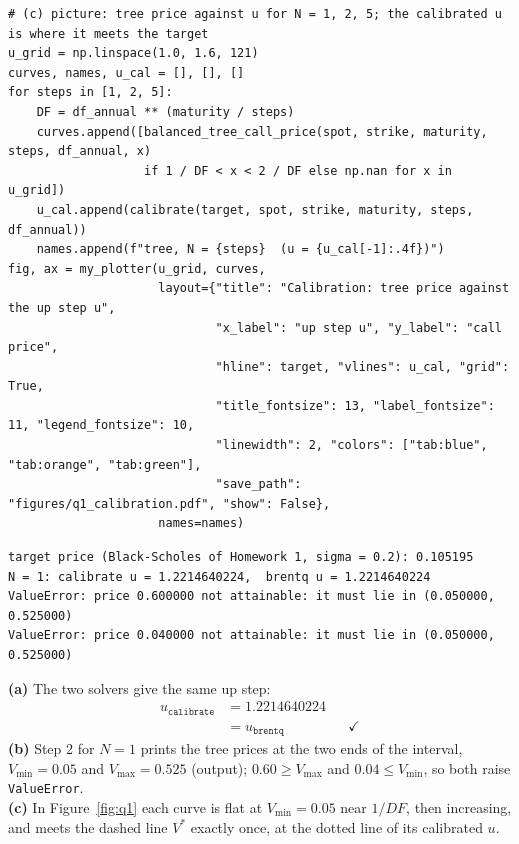 \documentclass[11pt,a4paper]{article}
\begin{document}
\begin{minipage}{\linewidth}
\begin{lstlisting}[style=pysmall,title={test (\texttt{q1\_calibrate\_test.py})}]
# (c) picture: tree price against u for N = 1, 2, 5; the calibrated u is where it meets the target
u_grid = np.linspace(1.0, 1.6, 121)
curves, names, u_cal = [], [], []
for steps in [1, 2, 5]:
    DF = df_annual ** (maturity / steps)
    curves.append([balanced_tree_call_price(spot, strike, maturity, steps, df_annual, x)
                   if 1 / DF < x < 2 / DF else np.nan for x in u_grid])
    u_cal.append(calibrate(target, spot, strike, maturity, steps, df_annual))
    names.append(f"tree, N = {steps}  (u = {u_cal[-1]:.4f})")
fig, ax = my_plotter(u_grid, curves,
                     layout={"title": "Calibration: tree price against the up step u",
                             "x_label": "up step u", "y_label": "call price",
                             "hline": target, "vlines": u_cal, "grid": True,
                             "title_fontsize": 13, "label_fontsize": 11, "legend_fontsize": 10,
                             "linewidth": 2, "colors": ["tab:blue", "tab:orange", "tab:green"],
                             "save_path": "figures/q1_calibration.pdf", "show": False},
                     names=names)
\end{lstlisting}
\begin{lstlisting}[style=out,title={output (\texttt{q1\_calibrate\_test.out})}]
target price (Black-Scholes of Homework 1, sigma = 0.2): 0.105195
N = 1: calibrate u = 1.2214640224,  brentq u = 1.2214640224
ValueError: price 0.600000 not attainable: it must lie in (0.050000, 0.525000)
ValueError: price 0.040000 not attainable: it must lie in (0.050000, 0.525000)
\end{lstlisting}\end{minipage}\par\smallskip

\noindent\textbf{(a)} The two solvers give the same up step:
\begin{align*}
u_{\texttt{calibrate}} &= 1.2214640224\\
&= u_{\texttt{brentq}} && \checkmark
\end{align*}
\textbf{(b)} Step 2 for $N=1$ prints the tree prices at the two ends of the interval, $V_{\min}=0.05$ and $V_{\max}=0.525$ (output); $0.60\ge V_{\max}$ and $0.04\le V_{\min}$, so both raise \texttt{ValueError}.\\
\textbf{(c)} In Figure~\ref{fig:q1} each curve is flat at $V_{\min}=0.05$ near $1/DF$, then increasing, and meets the dashed line $V^*$ exactly once, at the dotted line of its calibrated $u$.
\end{document}

